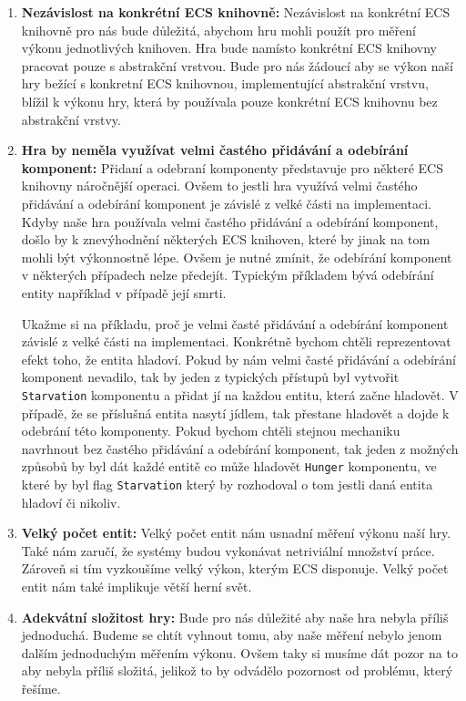 \begin{enumerate}
    \item \textbf{Nezávislost na konkrétní ECS knihovně:} Nezávislost na konkrétní ECS knihovně pro nás bude důležitá, abychom hru mohli použít pro měření výkonu jednotlivých knihoven. Hra bude namísto konkrétní ECS knihovny pracovat pouze s abstrakční vrstvou. Bude pro nás žádoucí aby se výkon naší hry bežící s konkretní ECS knihovnou, implementující abstrakční vrstvu, blížil k výkonu hry, která by používala pouze konkrétní ECS knihovnu bez abstrakční vrstvy.

    \item \textbf{Hra by neměla využívat velmi častého přidávání a odebírání komponent:} Přidaní a odebraní komponenty představuje pro některé ECS knihovny náročnější operaci. Ovšem to jestli hra využívá velmi častého přidávání a odebírání komponent je závislé z velké části na implementaci. Kdyby naše hra používala velmi častého přidávání a odebírání komponent, došlo by k znevýhodnění některých ECS knihoven, které by jinak na tom mohli být výkonnostně lépe. Ovšem je nutné zmínit, že odebírání komponent v některých případech nelze předejít. Typickým příkladem bývá odebírání entity například v případě její smrti.
    
    Ukažme si na příkladu, proč je velmi časté přidávání a odebírání komponent závislé z velké části na implementaci. Konkrétně bychom chtěli reprezentovat efekt toho, že entita hladoví. Pokud by nám velmi časté přidávání a odebírání komponent nevadilo, tak by jeden z typických přístupů byl vytvořit \verb|Starvation| komponentu a přidat jí na každou entitu, která začne hladovět. V případě, že se příslušná entita nasytí jídlem, tak přestane hladovět a dojde k odebrání této komponenty. Pokud bychom chtěli stejnou mechaniku navrhnout bez častého přidávání a odebírání komponent, tak jeden z možných způsobů by byl dát každé entitě co může hladovět \texttt{Hunger} komponentu, ve které by byl flag \verb|Starvation| který by rozhodoval o tom jestli daná entita hladoví či nikoliv.
    
    \item \textbf{Velký počet entit:} Velký počet entit nám usnadní měření výkonu naší hry. Také nám zaručí, že systémy budou vykonávat netriviální množství práce. Zároveň si tím vyzkoušíme velký výkon, kterým ECS disponuje. Velký počet entit nám také implikuje větší herní svět.
    
    \item \textbf{Adekvátní složitost hry:} Bude pro nás důležité aby naše hra nebyla příliš jednoduchá. Budeme se chtít vyhnout tomu, aby naše měření nebylo jenom dalším jednoduchým měřením výkonu. Ovšem taky si musíme dát pozor na to aby nebyla příliš složitá, jelikož to by odvádělo pozornost od problému, který řešíme.
\end{enumerate}


